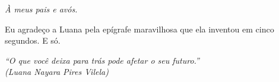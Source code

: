 \imprimircapa


\setcounter{page}{3}
\imprimirfolhaderosto*




\newpage
\vspace*{\fill}
\begin{center}
    
\end{center}
\vspace*{\fill}
\newpage
% 
\cleardoublepage


\begin{dedicatoria}
    \vspace*{\fill}
    \centering
    \noindent
    \textit{À meus pais e avós.}
    \vspace*{\fill}
\end{dedicatoria}

\begin{agradecimentos}
    Eu agradeço a Luana pela epígrafe maravilhosa que ela inventou em cinco segundos.
    E só.
\end{agradecimentos}

\begin{epigrafe}
    \vspace*{\fill}
    \begin{flushright}
        \textit{``O que você deixa para trás pode afetar o seu futuro.''\\
        (Luana Nayara Pires Vilela)}
    \end{flushright}
\end{epigrafe}

